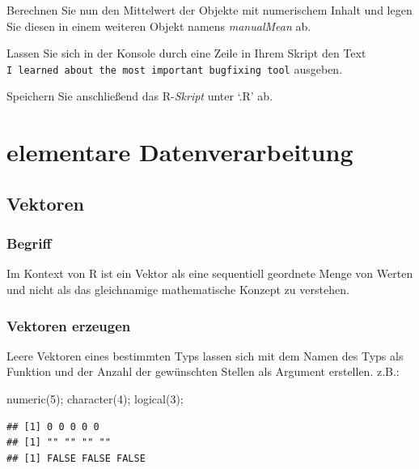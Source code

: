 \documentclass[
]{book}
\newenvironment{Shaded}{\begin{snugshade}}{\end{snugshade}}
\newcommand{\DecValTok}[1]{\textcolor[rgb]{0.00,0.00,0.81}{#1}}
\newcommand{\FunctionTok}[1]{\textcolor[rgb]{0.00,0.00,0.00}{#1}}
\newcommand{\NormalTok}[1]{#1}
\begin{document}
Berechnen Sie nun den Mittelwert der Objekte mit numerischem Inhalt und legen Sie diesen in einem weiteren Objekt namens \emph{manualMean} ab.

Lassen Sie sich in der Konsole durch eine Zeile in Ihrem Skript den Text \texttt{\textquotesingle{}I\ learned\ about\ the\ most\ important\ bugfixing\ tool\textquotesingle{}} ausgeben.

Speichern Sie anschließend das R-\emph{Skript} unter `.R' ab.

\hypertarget{elementare-datenverarbeitung}{%
\chapter{elementare Datenverarbeitung}\label{elementare-datenverarbeitung}}

\hypertarget{vektoren}{%
\section{Vektoren}\label{vektoren}}

\hypertarget{begriff}{%
\subsection{Begriff}\label{begriff}}

Im Kontext von R ist ein Vektor als eine sequentiell geordnete Menge von Werten und nicht als das gleichnamige mathematische Konzept zu verstehen.

\hypertarget{vektoren-erzeugen}{%
\subsection{Vektoren erzeugen}\label{vektoren-erzeugen}}

Leere Vektoren eines bestimmten Typs lassen sich mit dem Namen des Typs als Funktion und der Anzahl der gewünschten Stellen als Argument erstellen. z.B.:

\begin{Shaded}
\begin{Highlighting}[]
\FunctionTok{numeric}\NormalTok{(}\DecValTok{5}\NormalTok{);}
\FunctionTok{character}\NormalTok{(}\DecValTok{4}\NormalTok{);}
\FunctionTok{logical}\NormalTok{(}\DecValTok{3}\NormalTok{);}
\end{Highlighting}
\end{Shaded}

\begin{verbatim}
## [1] 0 0 0 0 0
## [1] "" "" "" ""
## [1] FALSE FALSE FALSE
\end{verbatim}
\end{document}
